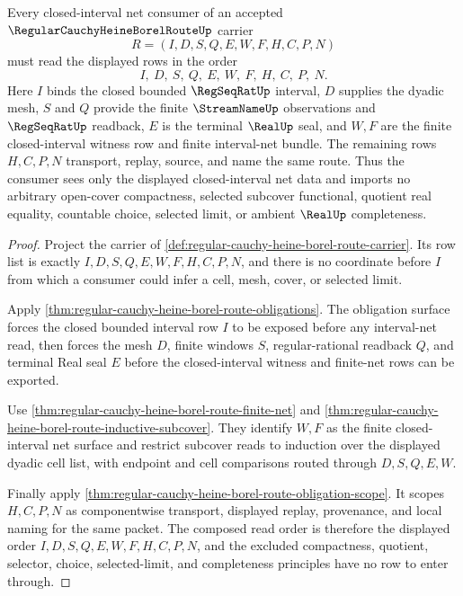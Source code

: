 \begin{theorem}
\label{thm:regular-cauchy-heine-borel-route-closed-interval-net-scope}
Every closed-interval net consumer of an accepted $\RegularCauchyHeineBorelRouteUp$ carrier
$$
R=(I,D,S,Q,E,W,F,H,C,P,N)
$$
must read the displayed rows in the order
$$
I,\ D,\ S,\ Q,\ E,\ W,\ F,\ H,\ C,\ P,\ N.
$$
Here $I$ binds the closed bounded $\RegSeqRatUp$ interval, $D$ supplies the dyadic mesh, $S$ and $Q$ provide the finite $\StreamNameUp$ observations and $\RegSeqRatUp$ readback, $E$ is the terminal $\RealUp$ seal, and $W,F$ are the finite closed-interval witness row and finite interval-net bundle. The remaining rows $H,C,P,N$ transport, replay, source, and name the same route. Thus the consumer sees only the displayed closed-interval net data and imports no arbitrary open-cover compactness, selected subcover functional, quotient real equality, countable choice, selected limit, or ambient $\RealUp$ completeness.
\end{theorem}
\begin{proof}
Project the carrier of \autoref{def:regular-cauchy-heine-borel-route-carrier}. Its row list is exactly $I,D,S,Q,E,W,F,H,C,P,N$, and there is no coordinate before $I$ from which a consumer could infer a cell, mesh, cover, or selected limit.

Apply \autoref{thm:regular-cauchy-heine-borel-route-obligations}. The obligation surface forces the closed bounded interval row $I$ to be exposed before any interval-net read, then forces the mesh $D$, finite windows $S$, regular-rational readback $Q$, and terminal Real seal $E$ before the closed-interval witness and finite-net rows can be exported.

Use \autoref{thm:regular-cauchy-heine-borel-route-finite-net} and \autoref{thm:regular-cauchy-heine-borel-route-inductive-subcover}. They identify $W,F$ as the finite closed-interval net surface and restrict subcover reads to induction over the displayed dyadic cell list, with endpoint and cell comparisons routed through $D,S,Q,E,W$.

Finally apply \autoref{thm:regular-cauchy-heine-borel-route-obligation-scope}. It scopes $H,C,P,N$ as componentwise transport, displayed replay, provenance, and local naming for the same packet. The composed read order is therefore the displayed order $I,D,S,Q,E,W,F,H,C,P,N$, and the excluded compactness, quotient, selector, choice, selected-limit, and completeness principles have no row to enter through.
\end{proof}

